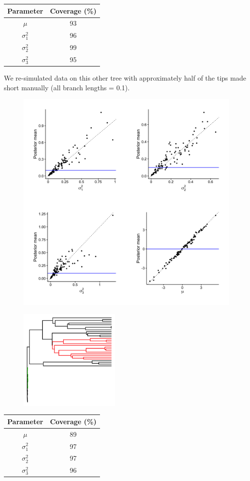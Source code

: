 \documentclass{article}
\begin{document}
\begin{center}
\begin{tabular}{c | c}
  Parameter & Coverage (\%) \\\hline
  $\mu$ & 93\\
  $\sigma_1^2$ & 96\\
  $\sigma_2^2$ & 99\\
  $\sigma_3^2$ & 95
\end{tabular}
\end{center}

\newpage

\noindent We re-simulated data on this other tree with approximately half of the tips made short manually (all branch lengths = 0.1).

\begin{figure}[h]
  \centering
  \includegraphics[width=12cm]{../BMMVNShiftThreeRates_nonultra_graphs.png}
\end{figure}

\begin{figure}[h]
  \centering
  \includegraphics[width=5cm]{../BMMVNShiftThreeRates_nonultra_tree.png}
\end{figure}

\begin{center}
\begin{tabular}{c | c}
  Parameter & Coverage (\%) \\\hline
  $\mu$ & 89\\
  $\sigma_1^2$ & 97\\
  $\sigma_2^2$ & 97\\
  $\sigma_3^2$ & 96
\end{tabular}
\end{center}
\end{document}
